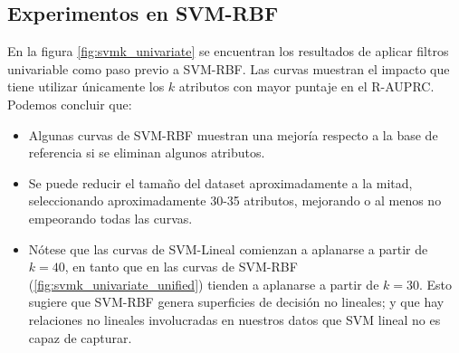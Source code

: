 \subsection{Experimentos en SVM-RBF}

En la figura \ref{fig:svmk_univariate} se encuentran los resultados de aplicar filtros univariable como paso previo a SVM-RBF. Las curvas muestran el impacto que tiene utilizar únicamente los $k$ atributos con mayor puntaje en el R-AUPRC. Podemos concluir que:

\begin{itemize}
\item Algunas curvas de SVM-RBF muestran una mejoría respecto a la base de referencia si se eliminan algunos atributos. 
\item Se puede reducir el tamaño del dataset aproximadamente a la mitad, seleccionando aproximadamente 30-35 atributos, mejorando o al menos no empeorando todas las curvas. 
\item Nótese que las curvas de SVM-Lineal comienzan a aplanarse a partir de $k=40$, en tanto que en las curvas de SVM-RBF (\ref{fig:svmk_univariate_unified}) tienden a aplanarse a partir de $k=30$. Esto sugiere que SVM-RBF genera superficies de decisión no lineales; y que hay relaciones no lineales involucradas en nuestros datos que SVM lineal no es capaz de capturar.
\end{itemize}

